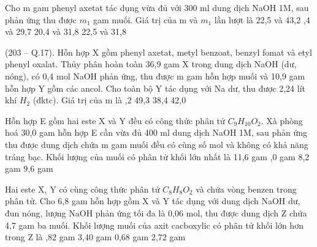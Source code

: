 \begin{ex}[3]%
	
	Cho m gam phenyl axetat tác dụng vừa đủ với 300 ml dung dịch NaOH 1M, sau phản ứng thu được ${m}_1$ gam muối. Giá trị của m và ${m}_1$ lần lượt là
	\choice
	{ 22,5 và 43,2}
	{,4 và 29,7}
	{ 20,4 và 31,8}
	{ 22,5 và 31,8}
	\sodongkeex[8]
	\loigiai{
}
\end{ex}



\begin{ex}[3]%
	
	(203 – Q.17). Hỗn hợp X gồm phenyl axetat, metyl benzoat, benzyl fomat và etyl phenyl oxalat. Thủy phân hoàn toàn 36,9 gam X trong dung dịch NaOH (dư, nóng), có 0,4 mol NaOH phản ứng, thu được m gam hỗn hợp muối và 10,9 gam hỗn hợp Y gồm các ancol. Cho toàn bộ Y tác dụng với Na dư, thu được 2,24 lít khí ${H}_2$ (đktc). Giá trị của m là
	\choice
	{,2}
	{ 49,3}
	{ 38,4}
	{ 42,0}
	\sodongkeex[8]
	\loigiai{
}
\end{ex}


\begin{ex}[3]%
	
	Hỗn hợp E gồm hai este X và Y đều có công thức phân tử ${C}_9{H}_{10}{O}_2$. Xà phòng hoá 30,0 gam hỗn hợp E cần vừa đủ 400 ml dung dịch NaOH 1M, sau phản ứng thu được dung dịch chứa m gam muối đều có cùng số mol và không có khả năng tráng bạc. Khối lượng của muối có phân tử khối lớn nhất là
	\choice
	{ 11,6 gam}
	{,0 gam}
	{ 8,2 gam}
	{ 9,6 gam}
	\sodongkeex[8]
	\loigiai{
}
\end{ex}


\begin{ex}[3]%
	Hai este X, Y có cùng công thức phân tử ${C}_8{H}_8{O}_2$ và chứa vòng benzen trong phân tử. Cho 6,8 gam hỗn hợp gồm X và Y tác dụng với dung dịch NaOH dư, đun nóng, lượng NaOH phản ứng tối đa là 0,06 mol, thu được dung dịch Z chứa 4,7 gam ba muối. Khối lượng muối của axit cacboxylic có phân tử khối lớn hơn trong Z là
	\choice
	{,82 gam}
	{ 3,40 gam}
	{ 0,68 gam}
	{ 2,72 gam}
	\sodongkeex[8]
	\loigiai{
}
\end{ex}















